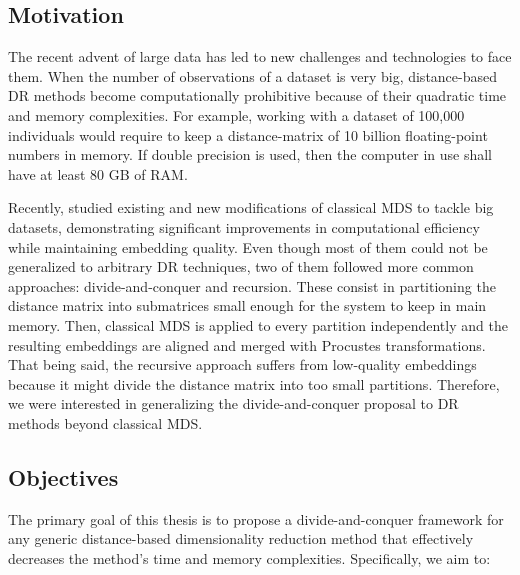 \subsection{Motivation}

The recent advent of large data has led to new challenges and technologies to face them. When the number of observations of a dataset is very big, distance-based DR methods become computationally prohibitive because of their quadratic time and memory complexities. For example, working with a dataset of 100,000 individuals would require to keep a distance-matrix of 10 billion floating-point numbers in memory. If double precision is used, then the computer in use shall have at least 80 GB of RAM.

Recently, \citet{Delicado2024} studied existing and new modifications of classical MDS to tackle big datasets, demonstrating significant improvements in computational efficiency while maintaining embedding quality. Even though most of them could not be generalized to arbitrary DR techniques, two of them followed more common approaches: divide-and-conquer and recursion. These consist in partitioning the distance matrix into submatrices small enough for the system to keep in main memory. Then, classical MDS is applied to every partition independently and the resulting embeddings are aligned and merged with Procustes transformations. That being said, the recursive approach suffers from low-quality embeddings because it might divide the distance matrix into too small partitions. Therefore, we were interested in generalizing the divide-and-conquer proposal to DR methods beyond classical MDS.

\subsection{Objectives}

The primary goal of this thesis is to propose a divide-and-conquer framework for any generic distance-based dimensionality reduction method that effectively decreases the method's time and memory complexities. Specifically, we aim to:

